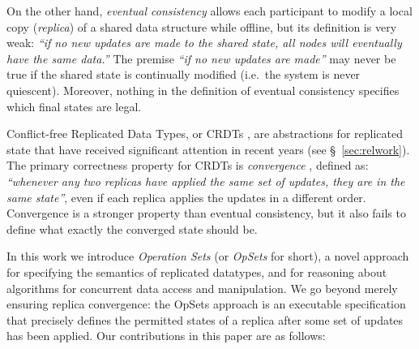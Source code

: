 \documentclass[a4paper,english]{lipics-v2018}
\begin{document}
On the other hand, \emph{eventual consistency} \cite{Bailis:2013jc,Burckhardt:2014hy,Terry:1994fp,Vogels:2009ca} allows each participant to modify a local copy (\emph{replica}) of a shared data structure while offline, but its definition is very weak: \emph{``if no new updates are made to the shared state, all nodes will eventually have the same data.''}
The premise \emph{``if no new updates are made''} may never be true if the shared state is continually modified (i.e.\ the system is never quiescent).
Moreover, nothing in the definition of eventual consistency specifies which final states are legal.

Conflict-free Replicated Data Types, or CRDTs \cite{Shapiro:2011wy,Shapiro:2011un}, are abstractions for replicated state that have received significant attention in recent years (see \S~\ref{sec:relwork}).
The primary correctness property for CRDTs is \emph{convergence} \cite{Shapiro:2011un,Gomes:2017gy}, defined as: \emph{``whenever any two replicas have applied the same set of updates, they are in the same state''}, even if each replica applies the updates in a different order.
Convergence is a stronger property than eventual consistency, but it also fails to define what exactly the converged state should be.

In this work we introduce \emph{Operation Sets} (or \emph{OpSets} for short), a novel approach for specifying the semantics of replicated datatypes, and for reasoning about algorithms for concurrent data access and manipulation.
We go beyond merely ensuring replica convergence: the OpSets approach is an executable specification that precisely defines the permitted states of a replica after some set of updates has been applied.
Our contributions in this paper are as follows:
\end{document}

